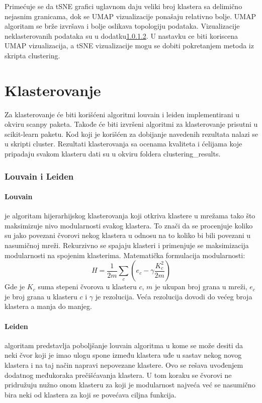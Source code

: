 \documentclass{article}
\begin{document}
Primećuje se da tSNE grafici uglavnom daju veliki broj klastera sa delimično nejasnim granicama, dok se UMAP vizualizacije ponašaju relativno bolje. UMAP algoritam se brže izvršava i bolje oslikava topologiju podataka. Vizualizacije neklasterovanih podataka su u dodatku\ref{}. U nastavku ce biti koriscena UMAP vizualizacija, a tSNE vizualizacije mogu se dobiti pokretanjem metoda iz skripta clustering.

\section{Klasterovanje}

Za klasterovanje će biti korišćeni algoritmi louvain i leiden implementirani u okviru scanpy paketa. Takođe će biti izvršeni algoritmi za klasterovanje prisutni u scikit-learn paketu. Kod koji je korišćen za dobijanje navedenih rezultata nalazi se u skripti cluster. Rezultati klasterovanja sa ocenama kvaliteta i ćelijama koje pripadaju svakom klasteru dati su u okviru foldera clustering\_results.

\subsubsection{Louvain i Leiden}

\paragraph{Louvain\cite{blondel2008fast,traag2019louvain}} je algoritam hijerarhijskog klasterovanja koji otkriva klastere u mrežama tako što maksimizuje nivo modularnosti svakog klastera. To znači da se procenjuje koliko su jako povezani čvorovi nekog klastera u odnosu na to koliko bi bili povezani u nasumičnoj mreži. Rekurzivno se spajaju klasteri i primenjuje se maksimizacija modularnosti na spojenim klasterima.
Matematička formulacija modularnosti:
$$
H = \frac{1}{2m}\sum_{c} (e_c - \gamma\frac{K_c^2}{2m})
$$
Gde je $K_c$ suma stepeni čvorova u klasteru $c$, $m$ je ukupan broj grana u mreži, $e_c$ je broj grana u klasteru $c$ i $\gamma$ je rezolucija. Veća rezolucija dovodi do većeg broja klastera a manja do manjeg.


\paragraph{Leiden\cite{traag2019louvain}} algoritam predstavlja poboljšanje louvain algoritma u kome se može desiti da neki čvor koji je imao ulogu spone između klastera uđe u sastav nekog novog klastera i na taj način napravi nepovezane klastere. Ovo se rešava uvođenjem dodatnog međukoraka prečišćavanja klastera. U tom koraku se čvorovi ne pridružuju nužno onom klasteru za koji je modularnost najveća već se nasumično bira neki od klastera za koji se povećava ciljna funkcija.
\end{document}
